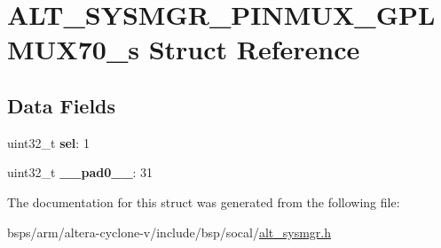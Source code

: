\hypertarget{structALT__SYSMGR__PINMUX__GPLMUX70__s}{}\section{A\+L\+T\+\_\+\+S\+Y\+S\+M\+G\+R\+\_\+\+P\+I\+N\+M\+U\+X\+\_\+\+G\+P\+L\+M\+U\+X70\+\_\+s Struct Reference}
\label{structALT__SYSMGR__PINMUX__GPLMUX70__s}
\subsection*{Data Fields}
\begin{DoxyCompactItemize}
\item 
\mbox{\label{structALT__SYSMGR__PINMUX__GPLMUX70__s_a054998e01ac7766a59107b0301d172a5}} 
uint32\+\_\+t {\bfseries sel}\+: 1
\item 
\mbox{\label{structALT__SYSMGR__PINMUX__GPLMUX70__s_ac0924d7e42f44e86af1fcec557fe4d69}} 
uint32\+\_\+t {\bfseries \+\_\+\+\_\+pad0\+\_\+\+\_\+}\+: 31
\end{DoxyCompactItemize}


The documentation for this struct was generated from the following file\+:\begin{DoxyCompactItemize}
\item 
bsps/arm/altera-\/cyclone-\/v/include/bsp/socal/\mbox{\hyperlink{alt__sysmgr_8h}{alt\+\_\+sysmgr.\+h}}\end{DoxyCompactItemize}
